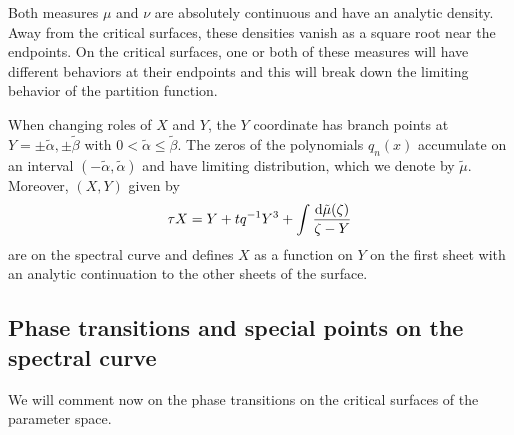 \documentclass[10pt,a4paper]{amsart}
\numberwithin{equation}{section}
\begin{document}
 Both measures $\mu$ and $\nu$ are absolutely continuous and have an analytic density. Away from the critical surfaces, these densities vanish as a square root near the endpoints. On the critical surfaces, one or both of these measures will have different behaviors at their endpoints and this will break down the limiting behavior of the partition function.


 \begin{Remark}
 When changing roles of $X$ and $Y$, the $Y$ coordinate has branch points at ${Y=\pm \tilde \alpha, \pm \tilde \beta}$ with $0<\tilde \alpha\leq \tilde \beta$. The zeros of the polynomials $q_n(x)$ accumulate on an interval $(-\tilde \alpha, \tilde \alpha)$ and have limiting distribution, which we denote by $\tilde \mu$. Moreover, $(X,Y)$ given by \begin{align*}
 \tau X = Y + t q^{-1} Y^3 + \int \frac{{\rm d}\tilde{\mu}(\zeta)}{\zeta - Y}
 \end{align*}
 are on the spectral curve and defines $X$ as a function on $Y$ on the first sheet with an analytic continuation to the other sheets of the surface.
\end{Remark}

\subsection{Phase transitions and special points on the spectral curve} \label{phase-transitions-section}
We will comment now on the phase transitions on the critical surfaces of the parameter space.
\end{document}
